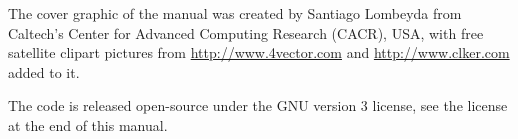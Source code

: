 The cover graphic of the manual was created by Santiago Lombeyda from
Caltech's Center for Advanced Computing Research (CACR), USA, with free satellite clipart pictures
from \url{http://www.4vector.com} and \url{http://www.clker.com} added to it.\newline

The code is released open-source under the GNU version 3 license, see the license at the end of this manual.\newline

